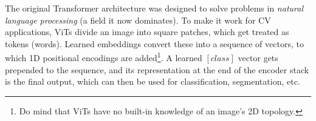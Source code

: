 The original Transformer architecture was designed to solve problems in \textit{natural language processing} (a field it now dominates). To make it work for CV applications, ViTs divide an image into square patches, which get treated as tokens (words). Learned embeddings convert these into a sequence of vectors, to which 1D positional encodings are added\footnote{Do mind that ViTs have no built-in knowledge of an image's 2D topology.}. A learned $[class]$ vector gets prepended to the sequence, and its representation at the end of the encoder stack is the final output, which can then be used for classification, segmentation, etc.






